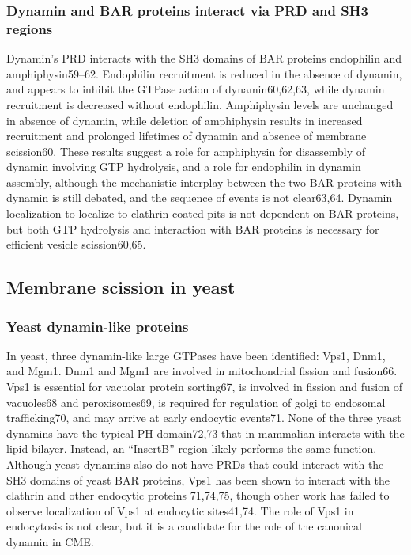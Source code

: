 		\subsubsection{Dynamin and BAR proteins interact via PRD and SH3 regions }
		Dynamin’s PRD interacts with the SH3 domains of BAR proteins endophilin and amphiphysin59–62. Endophilin recruitment is reduced in the absence of dynamin, and appears to inhibit the GTPase action of dynamin60,62,63, while dynamin recruitment is decreased without endophilin. Amphiphysin levels are unchanged in absence of dynamin, while deletion of amphiphysin results in increased recruitment and prolonged lifetimes of dynamin and absence of membrane scission60. These results suggest a role for amphiphysin for disassembly of dynamin involving GTP hydrolysis, and a role for endophilin in dynamin assembly, although the mechanistic interplay between the two BAR proteins with dynamin is still debated, and the sequence of events is not clear63,64. Dynamin localization to localize to clathrin-coated pits is not dependent on BAR proteins, but both GTP hydrolysis and interaction with BAR proteins is necessary for efficient vesicle scission60,65.

\label{key}

	\subsection{Membrane scission in yeast} \label {yeast_scission}
		\subsubsection{Yeast dynamin-like proteins}
		In yeast, three dynamin-like large GTPases have been identified: Vps1, Dnm1, and Mgm1. Dnm1 and Mgm1 are involved in mitochondrial fission and fusion66. Vps1 is essential for vacuolar protein sorting67, is involved in fission and fusion of vacuoles68 and peroxisomes69, is required for regulation of golgi to endosomal trafficking70, and may arrive at early endocytic events71. None of the three yeast dynamins have the typical PH domain72,73 that in mammalian interacts with the lipid bilayer. Instead, an “InsertB” region likely performs the same function. Although yeast dynamins also do not have PRDs that could interact with the SH3 domains of yeast BAR proteins, Vps1 has been shown to interact with the clathrin and other endocytic proteins 71,74,75, though other work has failed to observe localization of Vps1 at endocytic sites41,74. The role of Vps1 in endocytosis is not clear, but it is a candidate for the role of the canonical dynamin in CME.


